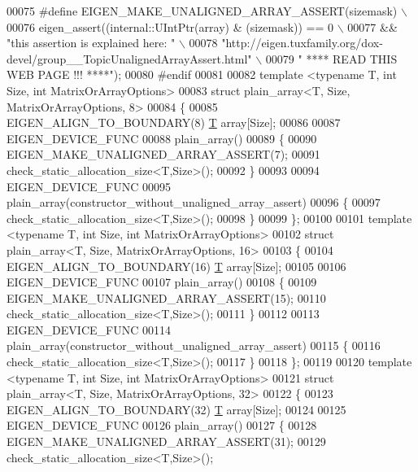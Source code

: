 \begin{DoxyCode}
00075 \textcolor{preprocessor}{  #define EIGEN\_MAKE\_UNALIGNED\_ARRAY\_ASSERT(sizemask) \(\backslash\)}
00076 \textcolor{preprocessor}{    eigen\_assert((internal::UIntPtr(array) & (sizemask)) == 0 \(\backslash\)}
00077 \textcolor{preprocessor}{              && "this assertion is explained here: " \(\backslash\)}
00078 \textcolor{preprocessor}{              "http://eigen.tuxfamily.org/dox-devel/group\_\_TopicUnalignedArrayAssert.html" \(\backslash\)}
00079 \textcolor{preprocessor}{              " **** READ THIS WEB PAGE !!! ****");}
00080 \textcolor{preprocessor}{#endif}
00081 
00082 \textcolor{keyword}{template} <\textcolor{keyword}{typename} T, \textcolor{keywordtype}{int} Size, \textcolor{keywordtype}{int} MatrixOrArrayOptions>
00083 \textcolor{keyword}{struct }plain\_array<T, Size, MatrixOrArrayOptions, 8>
00084 \{
00085   EIGEN\_ALIGN\_TO\_BOUNDARY(8) \hyperlink{group___sparse_core___module_class_eigen_1_1_triplet}{T} array[Size];
00086 
00087   EIGEN\_DEVICE\_FUNC
00088   plain\_array() 
00089   \{
00090     EIGEN\_MAKE\_UNALIGNED\_ARRAY\_ASSERT(7);
00091     check\_static\_allocation\_size<T,Size>();
00092   \}
00093 
00094   EIGEN\_DEVICE\_FUNC
00095   plain\_array(constructor\_without\_unaligned\_array\_assert) 
00096   \{ 
00097     check\_static\_allocation\_size<T,Size>();
00098   \}
00099 \};
00100 
00101 \textcolor{keyword}{template} <\textcolor{keyword}{typename} T, \textcolor{keywordtype}{int} Size, \textcolor{keywordtype}{int} MatrixOrArrayOptions>
00102 \textcolor{keyword}{struct }plain\_array<T, Size, MatrixOrArrayOptions, 16>
00103 \{
00104   EIGEN\_ALIGN\_TO\_BOUNDARY(16) \hyperlink{group___sparse_core___module_class_eigen_1_1_triplet}{T} array[Size];
00105 
00106   EIGEN\_DEVICE\_FUNC
00107   plain\_array() 
00108   \{ 
00109     EIGEN\_MAKE\_UNALIGNED\_ARRAY\_ASSERT(15);
00110     check\_static\_allocation\_size<T,Size>();
00111   \}
00112 
00113   EIGEN\_DEVICE\_FUNC
00114   plain\_array(constructor\_without\_unaligned\_array\_assert) 
00115   \{ 
00116     check\_static\_allocation\_size<T,Size>();
00117   \}
00118 \};
00119 
00120 \textcolor{keyword}{template} <\textcolor{keyword}{typename} T, \textcolor{keywordtype}{int} Size, \textcolor{keywordtype}{int} MatrixOrArrayOptions>
00121 \textcolor{keyword}{struct }plain\_array<T, Size, MatrixOrArrayOptions, 32>
00122 \{
00123   EIGEN\_ALIGN\_TO\_BOUNDARY(32) \hyperlink{group___sparse_core___module_class_eigen_1_1_triplet}{T} array[Size];
00124 
00125   EIGEN\_DEVICE\_FUNC
00126   plain\_array() 
00127   \{
00128     EIGEN\_MAKE\_UNALIGNED\_ARRAY\_ASSERT(31);
00129     check\_static\_allocation\_size<T,Size>();

\end{DoxyCode}
